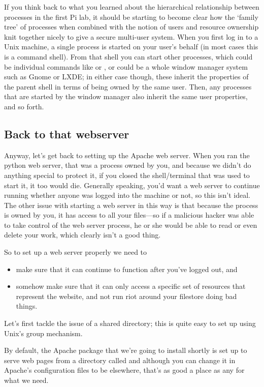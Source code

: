 If you think back to what you learned about the hierarchical relationship between processes in the first Pi lab, it should be starting to become clear how the `family tree' of processes when combined with the notion of users and resource ownership knit together nicely to give a secure multi-user system. When you first log in to a Unix machine, a single process is started on your user's behalf (in most cases this is a command shell). From that shell you can start other processes, which could be individual commands like  or , or could be a whole window manager system such as Gnome or LXDE; in either case though, these inherit the properties of the parent shell in terms of being owned by the same user. Then, any processes that are started by the window manager also inherit the same user properties, and so forth. 

\subsection{Back to that webserver}

Anyway, let's get back to setting up the Apache web server. When you ran the python web server, that was a process owned by you, and because we didn't do anything special to protect it, if you closed the shell/terminal that was used to start it, it too would die. Generally speaking, you'd want a web server to continue running whether anyone was logged into the machine or not, so this isn't ideal. The other issue with starting a web server in this way is that because the process is owned by you, it has access to all your files---so if a malicious hacker was able to take control of the web server process, he or she would be able to read or even delete your work, which clearly isn't a good thing. 

So to set up a web server properly we need to

\begin{itemize}
\item make sure that it can continue to function after you've logged out, and
\item somehow make sure that it can only access a specific set of resources that represent the website, and not run riot around your filestore doing bad things. 
\end{itemize}

Let's first tackle the issue of a shared directory; this is quite easy to set up using Unix's group mechanism. 

By default, the Apache package that we're going to install shortly is set up to serve web pages from a directory called  and although you can change it in Apache's configuration files to be elsewhere, that's as good a place as any for what we need. 

